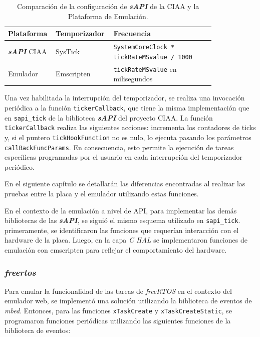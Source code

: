 \begin{table}[h]
\centering
\caption[Comparación de la configuración de \textit{\textbf{sAPI}} de la CIAA y la Plataforma de Emulación.]{Comparación de la configuración de \textit{\textbf{sAPI}} de la CIAA y la Plataforma de Emulación.}
\begin{tabular}{p{0.15\linewidth} p{0.20\linewidth}  p{0.47\linewidth}}
\toprule
\textbf{Plataforma} 
& \textbf{Temporizador}
& \textbf{Frecuencia}
\\
\midrule
\textit{\textbf{sAPI}} CIAA & SysTick & \texttt{SystemCoreClock * tickRateMSvalue / 1000}  \\
Emulador &  Emscripten & \texttt{tickRateMSvalue} en milisegundos \\

\bottomrule
\hline
\end{tabular}
\label{tab:ConfiguracionTicks}
\end{table}

Una vez habilitada la interrupción del temporizador, se realiza una invocación periódica a la función \texttt{tickerCallback}, que tiene la misma implementación que en \texttt{sapi\_tick} de la biblioteca \textit{\textbf{sAPI}} del proyecto CIAA. La función \newline \texttt{tickerCallback} realiza las siguientes acciones: incrementa los contadores de ticks y, si el puntero \texttt{tickHookFunction} no es nulo, lo ejecuta pasando los parámetros \texttt{callBackFuncParams}. En consecuencia, esto permite la ejecución de tareas específicas programadas por el usuario en cada interrupción del temporizador periódico.

En el siguiente capítulo se detallarán las diferencias encontradas al realizar las pruebas entre la placa y el emulador utilizando estas funciones.

En el contexto de la emulación a nivel de API, para implementar las demás bibliotecas de las \textit{\textbf{sAPI}}, se siguió el mismo esquema utilizado en \texttt{sapi\_tick}. primeramente, se identificaron las funciones que requerían interacción con el hardware de la placa. Luego, en la capa \textit{C HAL} se implementaron funciones de emulación con emscripten para reflejar el comportamiento del hardware.

\subsubsection{\textit{\textbf{freertos}}}

Para emular la funcionalidad de las tareas de \textit{freeRTOS} en el contexto del emulador web, se implementó una solución utilizando la biblioteca de eventos de \textit{mbed}. Entonces, para las funciones \texttt{xTaskCreate} y \texttt{xTaskCreateStatic}, se programaron funciones periódicas utilizando las siguientes funciones de la biblioteca de eventos: 

